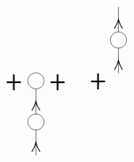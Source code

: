 \begin{equation}
\begin{tikzpicture}[x=0.75pt,y=0.75pt,yscale=-1,xscale=1]
\draw   (149.75,259.08) .. controls (149.75,253.74) and (154.12,249.4) .. (159.5,249.4) .. controls (164.88,249.4) and (169.25,253.74) .. (169.25,259.08) .. controls (169.25,264.43) and (164.88,268.77) .. (159.5,268.77) .. controls (154.12,268.77) and (149.75,264.43) .. (149.75,259.08) -- cycle ;
\draw    (159.5,299.08) -- (159.5,268.77) ;
\draw [shift={(159.5,283.93)}, rotate = 450] [color={rgb, 255:red, 0; green, 0; blue, 0 }  ][line width=0.75]    (10.93,-4.9) .. controls (6.95,-2.3) and (3.31,-0.67) .. (0,0) .. controls (3.31,0.67) and (6.95,2.3) .. (10.93,4.9)   ;
\draw   (149.75,308.77) .. controls (149.75,303.42) and (154.12,299.08) .. (159.5,299.08) .. controls (164.88,299.08) and (169.25,303.42) .. (169.25,308.77) .. controls (169.25,314.12) and (164.88,318.45) .. (159.5,318.45) .. controls (154.12,318.45) and (149.75,314.12) .. (149.75,308.77) -- cycle ;
\draw    (159.5,348.77) -- (159.5,318.45) ;
\draw [shift={(159.5,333.61)}, rotate = 450] [color={rgb, 255:red, 0; green, 0; blue, 0 }  ][line width=0.75]    (10.93,-4.9) .. controls (6.95,-2.3) and (3.31,-0.67) .. (0,0) .. controls (3.31,0.67) and (6.95,2.3) .. (10.93,4.9)   ;
\draw [line width=1.5]    (124.25,260.8) -- (141.25,260.8) ;
\draw [line width=1.5]    (132.75,270.4) -- (132.75,251.21) ;

\draw [line width=1.5]    (177.25,260.8) -- (194.25,260.8) ;
\draw [line width=1.5]    (185.75,270.4) -- (185.75,251.21) ;

\draw [line width=1.5]    (226.25,259.8) -- (243.25,259.8) ;
\draw [line width=1.5]    (234.75,269.4) -- (234.75,250.21) ;

\draw    (259.5,200.18) -- (259.5,169.86) ;
\draw [shift={(259.5,185.02)}, rotate = 450] [color={rgb, 255:red, 0; green, 0; blue, 0 }  ][line width=0.75]    (10.93,-4.9) .. controls (6.95,-2.3) and (3.31,-0.67) .. (0,0) .. controls (3.31,0.67) and (6.95,2.3) .. (10.93,4.9)   ;
\draw   (249.75,209.86) .. controls (249.75,204.52) and (254.12,200.18) .. (259.5,200.18) .. controls (264.88,200.18) and (269.25,204.52) .. (269.25,209.86) .. controls (269.25,215.21) and (264.88,219.55) .. (259.5,219.55) .. controls (254.12,219.55) and (249.75,215.21) .. (249.75,209.86) -- cycle ;
\draw    (259.5,249.86) -- (259.5,219.55) ;
\draw [shift={(259.5,234.71)}, rotate = 450] [color={rgb, 255:red, 0; green, 0; blue, 0 }  ][line width=0.75]    (10.93,-4.9) .. controls (6.95,-2.3) and (3.31,-0.67) .. (0,0) .. controls (3.31,0.67) and (6.95,2.3) .. (10.93,4.9)   ;


\end{tikzpicture}
\end{equation}
